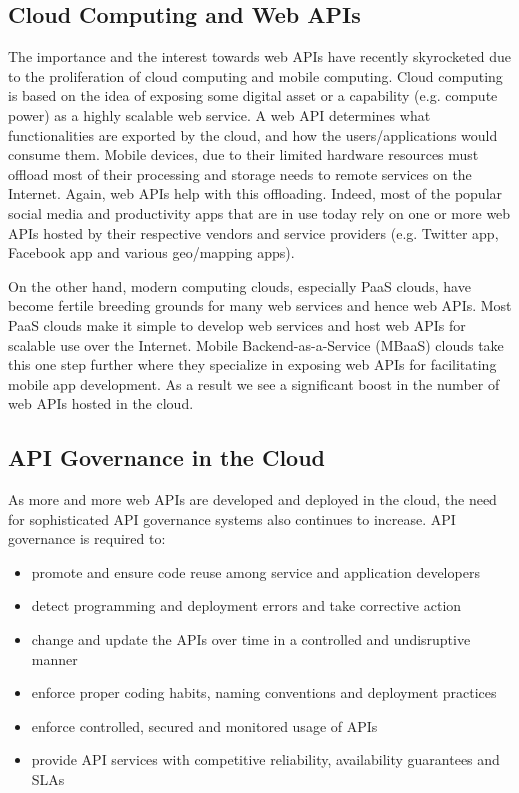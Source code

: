 \subsection{Cloud Computing and Web APIs}
The importance and the interest towards web APIs have recently skyrocketed due to the proliferation of cloud computing and mobile computing.
Cloud computing is based on the idea of exposing some digital asset or a capability (e.g. compute power) as a highly scalable web service. A 
web API determines
what functionalities are exported by the cloud, and how the users/applications would consume them. Mobile devices, due to their limited hardware
resources must offload most of their processing and storage needs to remote services on the Internet. Again, web APIs help with this offloading. 
Indeed, most of the popular social media and productivity apps
that are in use today rely on one or more web APIs hosted by their respective vendors and service providers (e.g. Twitter app, Facebook app and 
various geo/mapping apps).

On the other hand, modern computing clouds, especially PaaS clouds, have become fertile breeding grounds for many web services and hence 
web APIs. Most PaaS clouds make it simple to develop web services and host web APIs for scalable use over the Internet. Mobile 
Backend-as-a-Service (MBaaS) clouds take this one step further where they specialize in exposing web APIs for facilitating mobile
app development. As a result we see a significant boost in the number of web APIs hosted in the cloud.

\subsection{API Governance in the Cloud}
As more and more web APIs are developed and deployed in the cloud, the need for sophisticated API governance systems also continues to
increase. API governance is required to:
\begin{itemize}
\item promote and ensure code reuse among service and application developers
\item detect programming and deployment errors and take corrective action
\item change and update the APIs over time in a controlled and undisruptive manner
\item enforce proper coding habits, naming conventions and deployment practices
\item enforce controlled, secured and monitored usage of APIs
\item provide API services with competitive reliability, availability guarantees and SLAs
\end{itemize}

